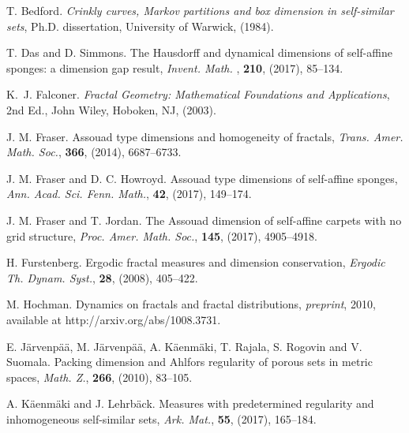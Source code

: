\documentclass[12pt]{amsart}
\numberwithin{equation}{section}
\begin{document}
\begin{thebibliography}{99}




T. Bedford.
{\em Crinkly curves, Markov partitions and box dimension in self-similar sets},
Ph.D. dissertation, University of Warwick, (1984).



T. Das and D. Simmons. 
The Hausdorff and dynamical dimensions of self-affine sponges: a dimension gap result,
\emph{Invent. Math.  }, {\bf 210}, (2017),  85--134. 



K.~J. Falconer.
{\em Fractal Geometry: Mathematical Foundations and Applications},
2nd Ed., John Wiley, Hoboken, NJ, (2003).


J. M. Fraser.
Assouad type dimensions and homogeneity of fractals,
\emph{Trans. Amer. Math. Soc.}, {\bf366}, (2014), 6687--6733.

J. M. Fraser and D. C. Howroyd. 
Assouad type dimensions of self-affine sponges,
\emph{Ann. Acad. Sci. Fenn. Math.}, \textbf{42}, (2017), 149--174.


J. M. Fraser and T. Jordan. 
The Assouad dimension of self-affine carpets with no grid structure,
\emph{Proc. Amer. Math. Soc.}, \textbf{145}, (2017), 4905--4918.






H. Furstenberg.
 Ergodic fractal measures and dimension conservation,
\emph{Ergodic Th. Dynam. Syst.}, {\bf 28}, (2008), 405--422.

M. Hochman.
Dynamics on fractals and fractal distributions,
\emph{preprint}, 2010, available at http://arxiv.org/abs/1008.3731.





E. J\"arvenp\"a\"a, M. J\"arvenp\"a\"a, A. K\"aenm\"aki, T. Rajala, S. Rogovin and V. Suomala.
Packing dimension and Ahlfors regularity of porous sets in metric spaces,
\emph{Math. Z.}, { \bf 266}, (2010),   83--105.




A. K{\"a}enm{\"a}ki and J. Lehrb{\"a}ck.
Measures with predetermined regularity and inhomogeneous self-similar sets,
\emph{Ark. Mat.}, {\bf 55}, (2017),   165--184.


\end{thebibliography}
\end{document}

